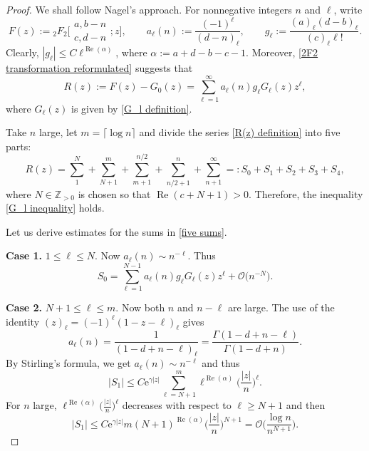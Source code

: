 \documentclass[pdftex]{sigma}
\numberwithin{equation}{section}
\newcommand{\ZZ}{\ensuremath{\mathbb{Z}}}
\newcommand{\mo}{\mathcal{O}}
\begin{document}
\begin{proof}
	We shall follow Nagel's approach. For nonnegative integers $n$ and $\ell$, write
	\[F(z):={}_2F_2\biggl[\begin{matrix}
		a,b-n\\
		c,d-n
	\end{matrix};z\biggr],\qquad a_{\ell}(n):=\frac{(-1)^{\ell}}{(d-n)_{\ell}},\qquad g_{\ell}:=\frac{(a)_{\ell}(d-b)_{\ell}}{(c)_{\ell}\ell!}.\]
	Clearly, $\left|g_\ell\right|\leqslant C\ell^{\operatorname{Re}(\alpha)}$, where $\alpha:=a+d-b-c-1$. Moreover, \eqref{2F2 transformation reformulated} suggests that
	\begin{equation}\label{R(z) definition}
		R(z):=F(z)-G_0(z)=\sum_{\ell=1}^{\infty}a_\ell(n)g_\ell G_\ell(z)z^{\ell},
	\end{equation}
	where $G_\ell(z)$ is given by \eqref{G_l definition}.
	
	Take $n$ large, let $m=\lceil \log n\rceil$ and divide the series \eqref{R(z) definition} into five parts:
	\begin{equation}\label{five sums}
		R(z)=\sum_{1}^{N}+\sum_{N+1}^m+\sum_{m+1}^{n/2}+\sum_{n/2+1}^n+\sum_{n+1}^{\infty}=:S_0+S_1+S_2+S_3+S_4,
	\end{equation}
	where $N\in\ZZ_{>0}$ is chosen so that $\operatorname{Re}(c+N+1)>0$. Therefore, the inequality \eqref{G_l inequality} holds.
	
	Let us derive estimates for the sums in \eqref{five sums}.
	
	\textbf{Case 1.} $1\leqslant \ell\leqslant N$. Now $a_\ell(n)\sim n^{-\ell}$. Thus
	\[S_0=\sum_{\ell=1}^{N-1}a_\ell(n)g_\ell G_\ell(z)z^{\ell}+\mo\big(n^{-N}\big).\]
	
	\textbf{Case 2.} $N+1\leqslant\ell\leqslant m$. Now both $n$ and $n-\ell$ are large. The use of the identity $(z)_\ell=(-1)^{\ell}(1-z-\ell)_{\ell}$ gives
	\begin{equation}\label{a_l(n) identity}
		a_\ell(n)=\frac{1}{(1-d+n-\ell)_\ell}=\frac{\Gamma(1-d+n-\ell)}{\Gamma(1-d+n)}.
	\end{equation}
	By Stirling's formula, we get $a_\ell(n)\sim n^{-\ell}$ and thus
	\[|S_1|\leqslant C\mathrm{e}^{\gamma|z|}\sum_{\ell=N+1}^{m}\ell^{\operatorname{Re}(\alpha)}\biggl(\frac{|z|}{n}\biggr)^{\ell}.\]
	For $n$ large, $\ell^{\operatorname{Re}(\alpha)}\big(\frac{|z|}{n}\big)^{\ell}$ decreases with respect to $\ell\geqslant N+1$ and then
	\[|S_1|\leqslant C\mathrm{e}^{\gamma|z|}m(N+1)^{\operatorname{Re}(\alpha)}\biggl(\frac{|z|}{n}\biggr)^{N+1}=\mo\biggl(\frac{\log n}{n^{N+1}}\biggr).\]
	

\end{proof}
\end{document}
